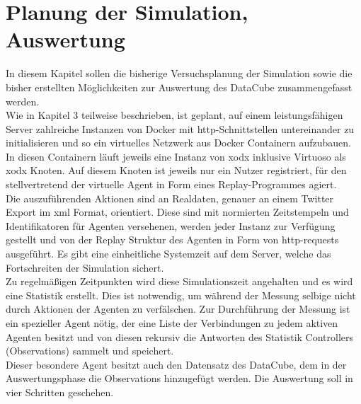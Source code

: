 \documentclass{article}
\begin{document}
\section{Planung der Simulation, Auswertung}

In diesem Kapitel sollen die bisherige Versuchsplanung der Simulation sowie die bisher erstellten Möglichkeiten zur Auswertung des DataCube zusammengefasst werden.\\
Wie in Kapitel 3 teilweise beschrieben, ist geplant, auf einem leistungsfähigen Server zahlreiche Instanzen von Docker mit http-Schnittstellen untereinander zu initialisieren und so ein virtuelles Netzwerk aus Docker Containern aufzubauen. In diesen Containern läuft jeweils eine Instanz von xodx inklusive Virtuoso als xodx Knoten. Auf diesem Knoten ist jeweils nur ein Nutzer registriert, für den stellvertretend der virtuelle Agent in Form eines Replay-Programmes agiert.\\
Die auszuführenden Aktionen sind an Realdaten, genauer an einem Twitter Export im xml Format, orientiert. Diese sind mit normierten Zeitstempeln und Identifikatoren für Agenten versehenen, werden jeder Instanz zur Verfügung gestellt und von der Replay Struktur des Agenten in Form von http-requests ausgeführt. Es gibt eine einheitliche Systemzeit auf dem Server, welche das Fortschreiten der Simulation sichert.\\
Zu regelmäßigen Zeitpunkten wird diese Simulationszeit angehalten und es wird eine Statistik erstellt. Dies ist notwendig, um während der Messung selbige nicht durch Aktionen der Agenten zu verfälschen. Zur Durchführung der Messung ist ein spezieller Agent nötig, der eine Liste der Verbindungen zu jedem aktiven Agenten besitzt und von diesen rekursiv die Antworten des Statistik Controllers (Observations) sammelt und speichert.\\
Dieser besondere Agent besitzt auch den Datensatz des DataCube, dem in der Auswertungsphase die Observations hinzugefügt werden. Die Auswertung soll in vier Schritten geschehen.
\end{document}
